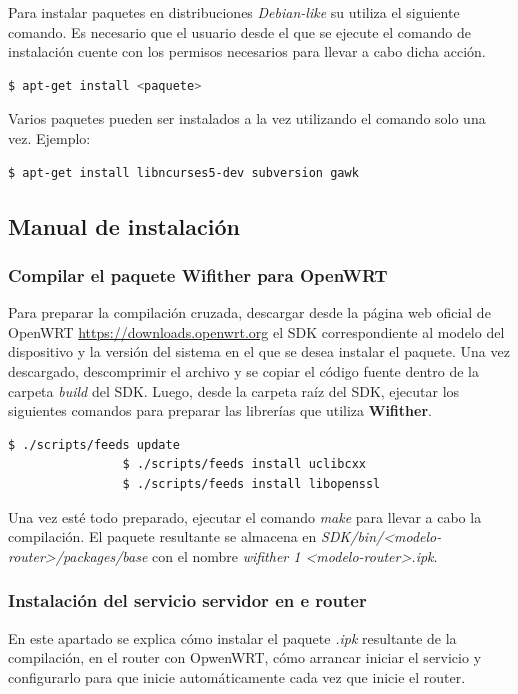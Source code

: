 \documentclass[12pt]{article}
\begin{document}
        Para instalar paquetes en distribuciones \textit{Debian-like} su utiliza el siguiente comando.
        Es necesario que el usuario desde el que se ejecute el comando de instalación cuente con los permisos necesarios para llevar a cabo dicha acción.

        \begin{lstlisting}[language=bash]
            $ apt-get install <paquete>
        \end{lstlisting}

        Varios paquetes pueden ser instalados a la vez utilizando el comando solo una vez.
        Ejemplo:

        \begin{lstlisting}[language=bash]
            $ apt-get install libncurses5-dev subversion gawk
        \end{lstlisting}

    \subsection{Manual de instalación}
        \subsubsection{Compilar el paquete Wifither para OpenWRT}
            Para preparar la compilación cruzada, descargar desde la página web oficial de OpenWRT \url{https://downloads.openwrt.org} el SDK correspondiente al modelo del dispositivo y la versión del sistema en el que se desea instalar el paquete. Una vez descargado, descomprimir el archivo y se copiar el código fuente dentro de la carpeta \textit{build} del SDK. Luego, desde la carpeta raíz del SDK, ejecutar los siguientes comandos para preparar las librerías que utiliza \textbf{Wifither}.

            \begin{lstlisting}[language=bash]
                $ ./scripts/feeds update
                $ ./scripts/feeds install uclibcxx
                $ ./scripts/feeds install libopenssl
            \end{lstlisting}

            Una vez esté todo preparado, ejecutar el comando \textit{make} para llevar a cabo la compilación. El paquete resultante se almacena en \textit{SDK/bin/<modelo-router>/packages/base} con el nombre \textit{wifither 1 <modelo-router>.ipk}.


        \subsubsection{Instalación del servicio servidor en e router}
            En este apartado se explica cómo instalar el paquete \textit{.ipk} resultante de la compilación, en el router con OpwenWRT, cómo arrancar iniciar el servicio y configurarlo para que inicie automáticamente cada vez que inicie el router.
\end{document}
